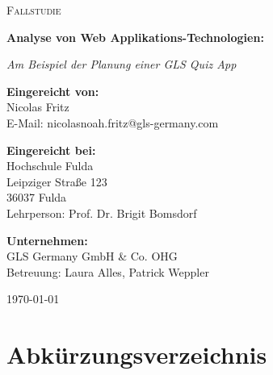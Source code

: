 \documentclass[biblatex]{lni}
\begin{document}
\begin{titlepage}
  \centering
  \vspace*{0.5cm}

  {\scshape\LARGE Fallstudie \par}

  {\huge\bfseries
    Analyse von Web Applikations-Technologien:
  \par
  }
  {\Large\itshape Am Beispiel der Planung einer GLS Quiz App\par}

  \vspace{1cm}

  {\Large\textbf{Eingereicht von: }}\\
  Nicolas Fritz \\
  E-Mail: nicolasnoah.fritz@gls-germany.com

  \vspace{1cm}

  {\Large\textbf{Eingereicht bei: }}\\
  Hochschule Fulda \\
  Leipziger Straße 123 \\
  36037 Fulda \\
  Lehrperson: Prof. Dr. Brigit Bomsdorf

  \vspace{1cm}

  {\Large\textbf{Unternehmen: }}\\
  GLS Germany GmbH & Co. OHG \\
  Betreuung: Laura Alles, Patrick Weppler

  \vfill

  {\large \today\par}
\end{titlepage}

\tableofcontents
\listoffigures
\newpage

\section*{Abkürzungsverzeichnis}
\begin{acronym}[Bash]
\end{acronym}
\newpage
\end{document}
